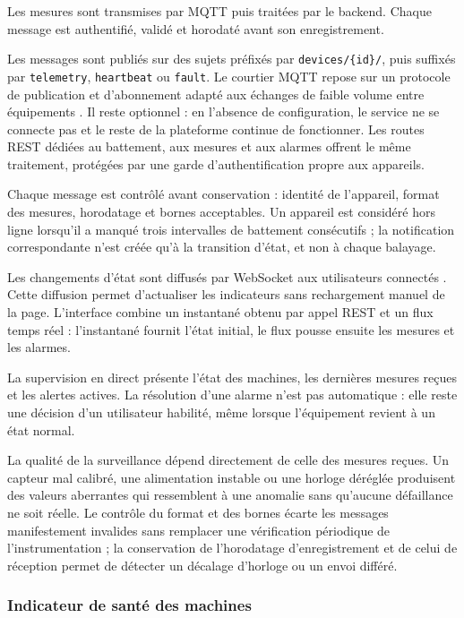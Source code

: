 Les mesures sont transmises par MQTT puis traitées par le backend. Chaque message est authentifié, validé et horodaté avant son enregistrement.

Les messages sont publiés sur des sujets préfixés par \texttt{devices/\{id\}/}, puis suffixés par \texttt{telemetry}, \texttt{heartbeat} ou \texttt{fault}. Le courtier MQTT repose sur un protocole de publication et d'abonnement adapté aux échanges de faible volume entre équipements \cite{mqtt_docs}. Il reste optionnel : en l'absence de configuration, le service ne se connecte pas et le reste de la plateforme continue de fonctionner. Les routes REST dédiées au battement, aux mesures et aux alarmes offrent le même traitement, protégées par une garde d'authentification propre aux appareils.

Chaque message est contrôlé avant conservation : identité de l'appareil, format des mesures, horodatage et bornes acceptables. Un appareil est considéré hors ligne lorsqu'il a manqué trois intervalles de battement consécutifs ; la notification correspondante n'est créée qu'à la transition d'état, et non à chaque balayage.

Les changements d'état sont diffusés par WebSocket aux utilisateurs connectés \cite{socketio_docs}. Cette diffusion permet d'actualiser les indicateurs sans rechargement manuel de la page. L'interface combine un instantané obtenu par appel REST et un flux temps réel : l'instantané fournit l'état initial, le flux pousse ensuite les mesures et les alarmes.

La supervision en direct présente l'état des machines, les dernières mesures reçues et les alertes actives. La résolution d'une alarme n'est pas automatique : elle reste une décision d'un utilisateur habilité, même lorsque l'équipement revient à un état normal.

La qualité de la surveillance dépend directement de celle des mesures reçues. Un capteur mal calibré, une alimentation instable ou une horloge déréglée produisent des valeurs aberrantes qui ressemblent à une anomalie sans qu'aucune défaillance ne soit réelle. Le contrôle du format et des bornes écarte les messages manifestement invalides sans remplacer une vérification périodique de l'instrumentation ; la conservation de l'horodatage d'enregistrement et de celui de réception permet de détecter un décalage d'horloge ou un envoi différé.

\subsubsection{Indicateur de santé des machines}

